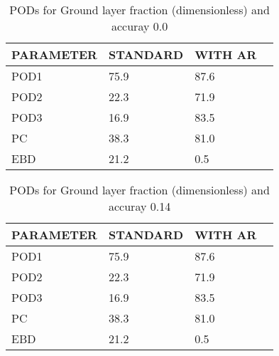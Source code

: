 \documentclass[11pt,english]{article}
\begin{document}
\begin{table}[]
\begin{center}
\begin{tabular}{|l|l|l|l|}
\hline
\multicolumn{1}{|c|}{\cellcolor[HTML]{C0C0C0}\textbf{PARAMETER}} & \multicolumn{1}{c|}{\cellcolor[HTML]{C0C0C0}\textbf{STANDARD}} & \multicolumn{1}{c|}{\cellcolor[HTML]{C0C0C0}\textbf{WITH AR}} \\
\hline
\cellcolor[HTML]{C0C0C0}POD1  & 75.9                                & 87.6         \\
\cellcolor[HTML]{C0C0C0}POD2  & 22.3                                & 71.9         \\
\cellcolor[HTML]{C0C0C0}POD3  & 16.9                                & 83.5         \\
\cellcolor[HTML]{C0C0C0}PC    & 38.3                                  & 81.0           \\
\cellcolor[HTML]{C0C0C0}EBD   & 21.2                                 & 0.5          \\
\hline
\end{tabular}
\caption{PODs for Ground layer fraction (dimensionless) and accuray 0.0}
\end{center}
\end{table}
\begin{table}[]
\begin{center}
\begin{tabular}{|l|l|l|l|}
\hline
\multicolumn{1}{|c|}{\cellcolor[HTML]{C0C0C0}\textbf{PARAMETER}} & \multicolumn{1}{c|}{\cellcolor[HTML]{C0C0C0}\textbf{STANDARD}} & \multicolumn{1}{c|}{\cellcolor[HTML]{C0C0C0}\textbf{WITH AR}} \\
\hline
\cellcolor[HTML]{C0C0C0}POD1  & 75.9                                & 87.6         \\
\cellcolor[HTML]{C0C0C0}POD2  & 22.3                                & 71.9         \\
\cellcolor[HTML]{C0C0C0}POD3  & 16.9                                & 83.5         \\
\cellcolor[HTML]{C0C0C0}PC    & 38.3                                  & 81.0           \\
\cellcolor[HTML]{C0C0C0}EBD   & 21.2                                 & 0.5          \\
\hline
\end{tabular}
\caption{PODs for Ground layer fraction (dimensionless) and accuray 0.14}
\end{center}
\end{table}
\end{document}
